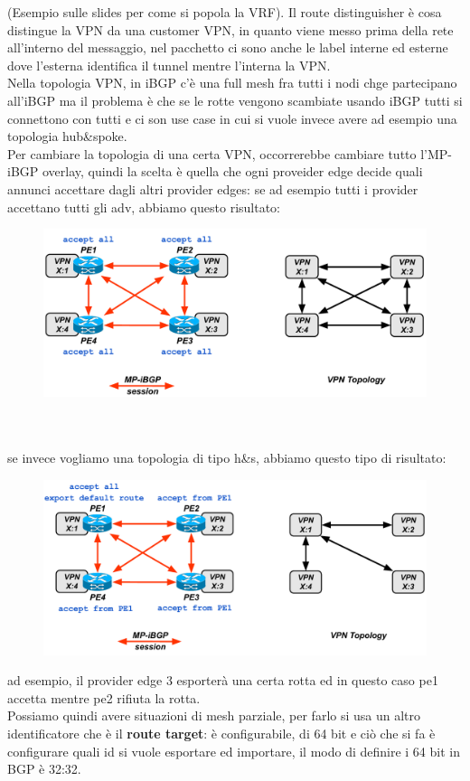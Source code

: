 \documentclass[12pt, oneside]{extbook} %
\begin{document}
(Esempio sulle slides per come si popola la VRF).
Il route distinguisher è cosa distingue la VPN da una customer VPN, in quanto viene messo prima della rete all'interno del messaggio, nel pacchetto ci sono anche le label interne ed esterne dove l'esterna identifica il tunnel mentre l'interna la VPN.
\\Nella topologia VPN, in iBGP c'è una full mesh fra tutti i nodi chge partecipano all'iBGP ma il problema è che se le rotte vengono scambiate usando iBGP tutti si connettono con tutti e ci son use case in cui si vuole invece avere ad esempio una topologia hub\&spoke.
\\Per cambiare la topologia di una certa VPN, occorrerebbe cambiare tutto l'MP-iBGP overlay, quindi la scelta è quella che ogni proveider edge decide quali annunci accettare dagli altri provider edges: se ad esempio tutti i provider accettano tutti gli adv, abbiamo questo risultato:\\
\begin{figure}[h!]
    \centering
    \includegraphics[scale=0.5]{../../immagini/vpn_fullmesh}
\end{figure}\\\\
se invece vogliamo una topologia di tipo h\&s, abbiamo questo tipo di risultato:\\
\begin{figure}[h!]
    \centering
    \includegraphics[scale=0.5]{../../immagini/vpn_hs}
\end{figure}
ad esempio, il provider edge 3 esporterà una certa rotta ed in questo caso pe1 accetta mentre pe2 rifiuta la rotta.
\\Possiamo quindi avere situazioni di mesh parziale, per farlo si usa un altro identificatore che è il \textbf{route target}: è configurabile, di 64 bit e ciò che si fa è configurare quali id si vuole esportare ed importare, il modo di definire i 64 bit in BGP è 32:32.
\end{document}
